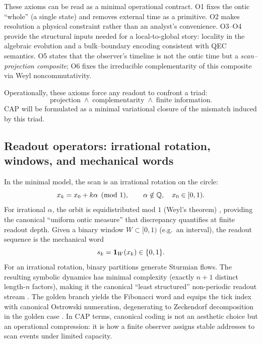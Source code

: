 \noindent These axioms can be read as a minimal operational contract. O1 fixes the ontic ``whole'' (a single state) and removes external time as a primitive. O2 makes resolution a physical constraint rather than an analyst's convenience. O3--O4 provide the structural inputs needed for a local-to-global story: locality in the algebraic evolution and a bulk--boundary encoding consistent with QEC semantics. O5 states that the observer's timeline is not the ontic time but a \emph{scan--projection composite}; O6 fixes the irreducible complementarity of this composite via Weyl noncommutativity.

Operationally, these axioms force any readout to confront a triad:
\begin{equation}
  \text{projection} \;\wedge\; \text{complementarity} \;\wedge\; \text{finite information}.
\end{equation}
CAP will be formulated as a minimal variational closure of the mismatch induced by this triad.

\subsection{Readout operators: irrational rotation, windows, and mechanical words}
\label{subsec:readout_operators}

In the minimal model, the scan is an irrational rotation on the circle:
\begin{equation}
  x_k = x_0 + k\alpha \pmod{1},
  \qquad \alpha\notin\mathbb{Q},\quad x_0\in[0,1).
\end{equation}
For irrational $\alpha$, the orbit is equidistributed mod $1$ (Weyl's theorem) \cite{Weyl1916}, providing the canonical ``uniform ontic measure'' that discrepancy quantifies at finite readout depth.
Given a binary window $W\subset[0,1)$ (e.g.\ an interval), the readout sequence is the mechanical word
\begin{equation}
  s_k = \mathbf{1}_{W}(x_k) \in \{0,1\}.
\end{equation}
For an irrational rotation, binary partitions generate Sturmian flows. The resulting symbolic dynamics has minimal complexity (exactly $n+1$ distinct length-$n$ factors), making it the canonical ``least structured'' non-periodic readout stream \cite{MorseHedlund1940,Lothaire2002}. The golden branch yields the Fibonacci word and equips the tick index with canonical Ostrowski numeration, degenerating to Zeckendorf decomposition in the golden case \cite{Ma2025HPA,Zeckendorf1972}. In CAP terms, canonical coding is not an aesthetic choice but an operational compression: it is how a finite observer assigns stable addresses to scan events under limited capacity.

